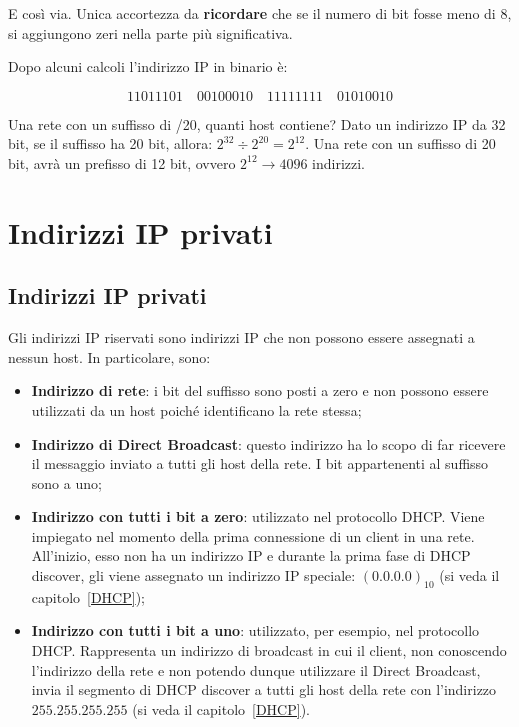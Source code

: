 \documentclass[a4paper]{article}
\newcommand{\binaryaddress}[4]{#1 \hspace{1em} #2 \hspace{1em} #3 \hspace{1em} #4}
\begin{document}
	\noindent
	E così via. Unica accortezza da \textbf{ricordare} che se il numero di bit fosse meno di 8, si aggiungono zeri nella parte più significativa.\newline
	
	\noindent
	Dopo alcuni calcoli l’indirizzo IP in binario è:
	
	\begin{equation*}
		\binaryaddress{11011101}{00100010}{11111111}{01010010}
	\end{equation*}

	\noindent
	Una rete con un suffisso di /20, quanti host contiene? Dato un indirizzo IP da 32 bit, se il suffisso ha 20 bit, allora: $2^{32} \div 2^{20} = 2^{12}$. Una rete con un suffisso di 20 bit, avrà un prefisso di 12 bit, ovvero $2^{12} \longrightarrow 4096$ indirizzi.
	
	\newpage
	
	\section{Indirizzi IP privati}
	
	\subsection{Indirizzi IP privati}
	
	Gli indirizzi IP riservati sono indirizzi IP che non possono essere assegnati a nessun host. In particolare, sono:
	
	\begin{itemize}
		\item \textbf{Indirizzo di rete}: i bit del suffisso sono posti a zero e non possono essere utilizzati da un host poiché identificano la rete stessa;
		\item \textbf{Indirizzo di Direct Broadcast}: questo indirizzo ha lo scopo di far ricevere il messaggio inviato a tutti gli host della rete. I bit appartenenti al suffisso sono a uno;
		\item \textbf{Indirizzo con tutti i bit a zero}: utilizzato nel protocollo DHCP. Viene impiegato nel momento della prima connessione di un client in una rete. All'inizio, esso non ha un indirizzo IP e durante la prima fase di DHCP discover, gli viene assegnato un indirizzo IP speciale: $\left(0.0.0.0\right)_{10}$ (si veda il capitolo~\ref{DHCP});
		\item \textbf{Indirizzo con tutti i bit a uno}: utilizzato, per esempio, nel protocollo DHCP. Rappresenta un indirizzo di broadcast in cui il client, non conoscendo l'indirizzo della rete e non potendo dunque utilizzare il Direct Broadcast, invia il segmento di DHCP discover a tutti gli host della rete con l'indirizzo $255.255.255.255$ (si veda il capitolo~\ref{DHCP}).
	\end{itemize}
\end{document}

